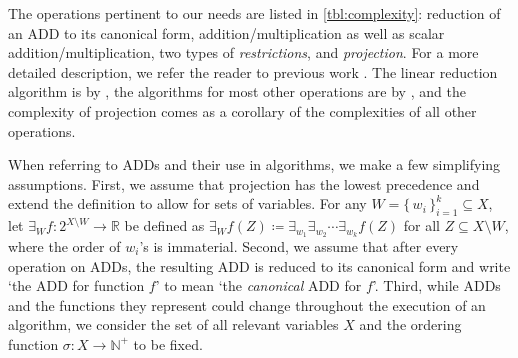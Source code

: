 The operations pertinent to our needs are listed in \cref{tbl:complexity}:
reduction of an ADD to its canonical form, addition/multiplication as well as
scalar addition/multiplication, two types of \emph{restrictions}, and
\emph{projection}. For a more detailed description, we refer the reader to
previous work \citep{DBLP:journals/fmsd/BaharFGHMPS97,DBLP:conf/aaai/DudekPV20}.
The linear reduction algorithm is by \citet{somenzi1998cudd}, the algorithms for
most other operations are by \citet{DBLP:journals/tc/Bryant86}, and the
complexity of projection comes as a corollary of the complexities of all other
operations.

When referring to ADDs and their use in algorithms, we make a few simplifying
assumptions. First, we assume that projection has the lowest precedence and
extend the definition to allow for sets of variables. For any
$W = {\{\,w_i\,\}}_{i=1}^k \subseteq X$, let
$\exists_W f\colon 2^{X \setminus W} \to \mathbb{R}$ be defined as
$\exists_{W}f(Z) \coloneqq \exists_{w_1}\exists_{w_2}\cdots\exists_{w_k}f(Z)$
for all $Z \subseteq X \setminus W$, where the order of $w_i$'s is immaterial.
Second, we assume that after every operation on ADDs, the resulting ADD is
reduced to its canonical form and write `the ADD for function $f$' to mean `the
\emph{canonical} ADD for $f$'. Third, while ADDs and the functions they
represent could change throughout the execution of an algorithm, we consider the
set of all relevant variables $X$ and the ordering function
$\sigma\colon X \to \mathbb{N}^+$ to be fixed.




